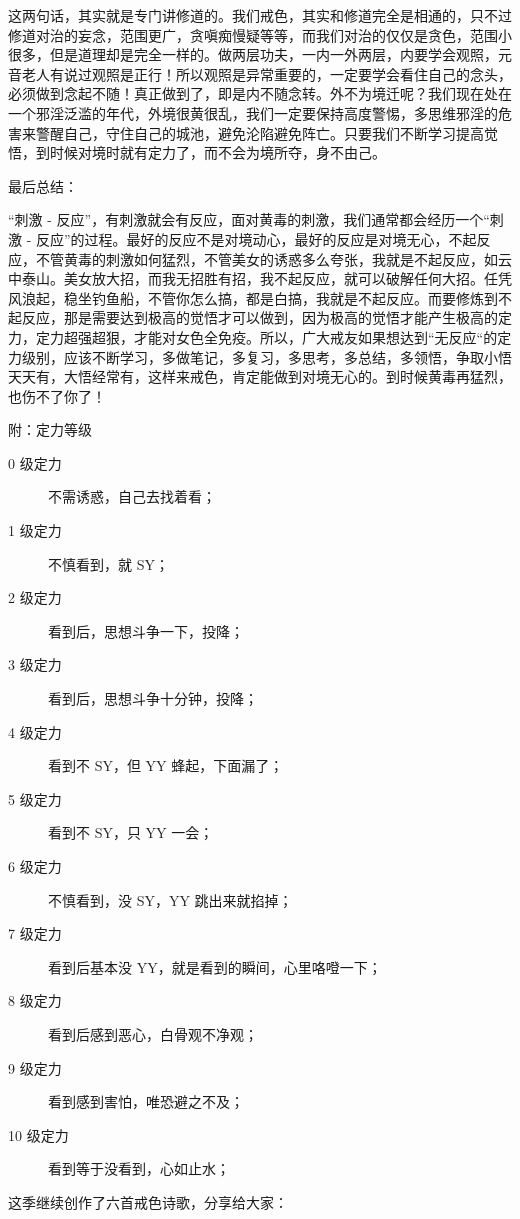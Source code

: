 \documentclass{ctexart}
\begin{document}
这两句话，其实就是专门讲修道的。我们戒色，其实和修道完全是相通的，只不过修道对治的妄念，范围更广，贪嗔痴慢疑等等，而我们对治的仅仅是贪色，范围小很多，但是道理却是完全一样的。做两层功夫，一内一外两层，内要学会观照，元音老人有说过观照是正行！所以观照是异常重要的，一定要学会看住自己的念头，必须做到念起不随！真正做到了，即是内不随念转。外不为境迁呢？我们现在处在一个邪淫泛滥的年代，外境很黄很乱，我们一定要保持高度警惕，多思维邪淫的危害来警醒自己，守住自己的城池，避免沦陷避免阵亡。只要我们不断学习提高觉悟，到时候对境时就有定力了，而不会为境所夺，身不由己。

最后总结：

“刺激 - 反应”，有刺激就会有反应，面对黄毒的刺激，我们通常都会经历一个“刺激 - 反应”的过程。最好的反应不是对境动心，最好的反应是对境无心，不起反应，不管黄毒的刺激如何猛烈，不管美女的诱惑多么夸张，我就是不起反应，如云中泰山。美女放大招，而我无招胜有招，我不起反应，就可以破解任何大招。任凭风浪起，稳坐钓鱼船，不管你怎么搞，都是白搞，我就是不起反应。而要修炼到不起反应，那是需要达到极高的觉悟才可以做到，因为极高的觉悟才能产生极高的定力，定力超强超狠，才能对女色全免疫。所以，广大戒友如果想达到“无反应“的定力级别，应该不断学习，多做笔记，多复习，多思考，多总结，多领悟，争取小悟天天有，大悟经常有，这样来戒色，肯定能做到对境无心的。到时候黄毒再猛烈，也伤不了你了！


附：定力等级

\begin{description}
    \item[0 级定力] 不需诱惑，自己去找着看；
    \item[1 级定力] 不慎看到，就 SY；
    \item[2 级定力] 看到后，思想斗争一下，投降；
    \item[3 级定力] 看到后，思想斗争十分钟，投降；
    \item[4 级定力] 看到不 SY，但 YY 蜂起，下面漏了；
    \item[5 级定力] 看到不 SY，只 YY 一会；
    \item[6 级定力] 不慎看到，没 SY，YY 跳出来就掐掉；
    \item[7 级定力] 看到后基本没 YY，就是看到的瞬间，心里咯噔一下；
    \item[8 级定力] 看到后感到恶心，白骨观不净观；
    \item[9 级定力] 看到感到害怕，唯恐避之不及；
    \item[10 级定力] 看到等于没看到，心如止水；
\end{description}

这季继续创作了六首戒色诗歌，分享给大家：
\end{document}
